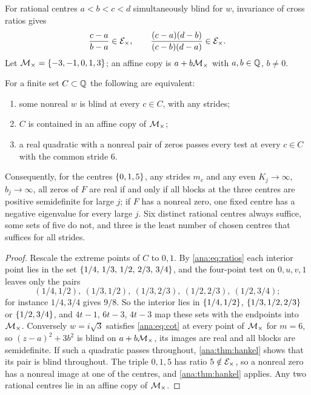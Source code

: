 For rational centres $a<b<c<d$ simultaneously blind for $w$, invariance of cross ratios gives
\begin{equation}\label{ana:eq:ratios}
 \frac{c-a}{b-a}\in\mathcal{E}_\times,\qquad\frac{(c-a)(d-b)}{(c-b)(d-a)}\in\mathcal{E}_\times .
\end{equation}
Let $\mathcal{M}_\times=\{-3,-1,0,1,3\}$; an affine copy is $a+b\mathcal{M}_\times$ with $a,b\in\mathbb{Q}$, $b\ne0$.

\begin{theorem}\label{ana:thm:centres}
For a finite set $C\subset\mathbb{Q}$ the following are equivalent:
\begin{enumerate}[label=\textup{(\arabic*)}]
\item some nonreal $w$ is blind at every $c\in C$, with any strides;
\item $C$ is contained in an affine copy of $\mathcal{M}_\times$;
\item a real quadratic with a nonreal pair of zeros passes every test at every $c\in C$ with
 the common stride $6$.
\end{enumerate}
Consequently, for the centres $\{0,1,5\}$, any strides $m_c$ and any even $K_j\to\infty$,
$b_j\to\infty$, all zeros of $F$ are real if and only if all blocks at the three centres are
positive semidefinite for large $j$; if $F$ has a nonreal zero, one fixed centre has a negative
eigenvalue for every large $j$. Six distinct rational centres always suffice, some sets of
five do not, and three is the least number of chosen centres that suffices for all strides.
\end{theorem}

\begin{proof}
Rescale the extreme points of $C$ to $0,1$. By \eqref{ana:eq:ratios} each interior point lies
in the set $\{1/4,\,1/3,\,1/2,\,2/3,\,3/4\}$, and the four-point test on $0,u,v,1$ leaves only the pairs
\[
 (1/4,1/2),\ (1/3,1/2),\ (1/3,2/3),\ (1/2,2/3),\ (1/2,3/4);
\]
for instance $1/4,3/4$ gives $9/8$. So the interior lies in $\{1/4,1/2\}$,
$\{1/3,1/2,2/3\}$ or $\{1/2,3/4\}$, and $4t-1$, $6t-3$, $4t-3$ map these sets with the
endpoints into $\mathcal{M}_\times$. Conversely $w=i\sqrt3$ satisfies
\eqref{ana:eq:cot} at every point of $\mathcal{M}_\times$ for $m=6$, so $(z-a)^2+3b^2$ is blind on
$a+b\mathcal{M}_\times$, its images are real and all blocks are semidefinite. If such a quadratic passes
throughout, \cref{ana:thm:hankel} shows that its pair is blind throughout. The triple $0,1,5$
has ratio $5\notin\mathcal{E}_\times$, so a nonreal zero has a nonreal image at one of the centres,
and \cref{ana:thm:hankel} applies. Any two rational centres lie in an affine copy of
$\mathcal{M}_\times$.
\end{proof}

